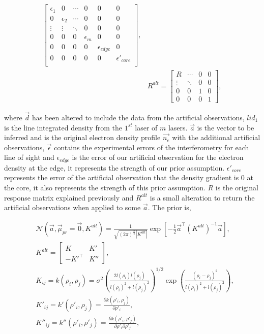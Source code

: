 $$\begin{aligned}
\begin{bmatrix}
\epsilon_1 & 0 & \cdots & 0 & 0 & 0\\
0 & \epsilon_2 & \cdots & 0 & 0 & 0\\
\vdots & \vdots & \ddots & 0 & 0 & 0\\
0 & 0 & 0 &\epsilon_m & 0 & 0\\
0 & 0 & 0 & 0 & \epsilon_{edge} & 0\\
0 & 0 & 0 & 0 & 0 & \epsilon'_{core}\\
\end{bmatrix},\\
&R^{alt} =\begin{bmatrix}
R & \cdots & 0 & 0\\
\vdots & \ddots & 0 & 0\\
0 & 0 & 1 & 0 \\
0 & 0 & 0 & 1
\end{bmatrix},
\end{aligned}
$$

\noindent where $\vec d$ has been altered to include the data from the artificial observations, $lid_1$ is the line integrated density from the $1^{st}$ laser of $m$ lasers. $\vec a$ is the vector to be inferred and is the original electron density profile $\vec{n_e}$ with the additional artificial observations, $\vec \epsilon$ contains the experimental errors of the interferometry for each line of sight and $\epsilon_{edge}$ is the error of our artificial observation for the electron density at the edge, it represents the strength of our prior assumption. $\epsilon'_{core}$ represents the error of the artificial observation that the density gradient is 0 at the core, it also represents the strength of this prior assumption. $R$ is the original response matrix explained previously and $R^{alt}$ is a small alteration to return the artificial observations when applied to some $\vec a$. The prior is,

$$
\begin{aligned}
&\mathcal{N}(\vec{a}, \vec \mu_{pr} = \vec{0}, K^{alt}) = \frac{1}{\sqrt{(2\pi)^{\frac{n}{2}}|K^{alt}|}} \exp \left[{{-\frac{1}{2}\vec{a}^\top (K^{alt})^{-1}\vec{a}}}\right],\\
&K^{alt} = \begin{bmatrix} K & K'\\ -K'^\top & K''\end{bmatrix},\\
&K_{ij} = k(\rho_i, \rho_j) = \sigma^2 \left( \frac{2l(\rho_i)l(\rho_j)}{l(\rho_i)^2 + l(\rho_j)^2} \right)^{1/2} \exp\left({\frac{(\rho_i - \rho_j)^2}{l(\rho_i)^2+l(\rho_j)^2}}\right),\\
&K'_{ij} = k'(\rho'_i, \rho_j) = \frac{\partial k{(\rho'_i,\rho_j)}}{\partial \rho'_i},\\
&K''_{ij} = k''(\rho'_i, \rho'_j) = \frac{\partial k{(\rho'_i,\rho'_j)}}{\partial \rho'_i\partial \rho'_j},\\
\end{aligned}
$$

